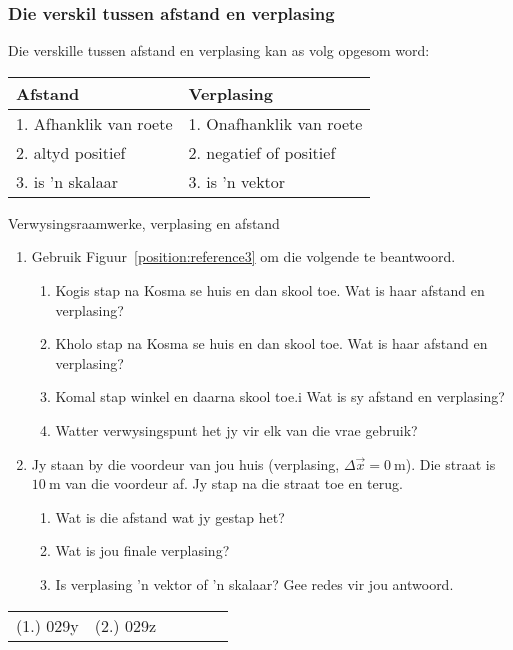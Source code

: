 \subsubsection*{Die verskil tussen afstand en verplasing}
            \nopagebreak
Die verskille tussen afstand en verplasing kan as volg opgesom word:\par
\begin{center}
\begin{tabular}{|l|l|}\hline
\textbf{ Afstand} & \textbf{ Verplasing} \\\hline
1. Afhanklik van roete & 1. Onafhanklik van roete \\\hline
2. altyd positief & 2. negatief of positief \\\hline
3. is 'n skalaar & 3. is 'n vektor\\\hline
\end{tabular}
\end{center}
    \par
\label{m38788*secfhsst!!!underscore!!!id498}
\begin{exercises}{Verwysingsraamwerke, verplasing en afstand}
\nopagebreak \noindent
\begin{enumerate}[noitemsep, label=\textbf{\arabic*}. ] 
\item Gebruik Figuur~\ref{position:reference3} om die volgende te beantwoord.
\begin{enumerate}[noitemsep, label=\textbf{\alph*}. ] 
    \item Kogis stap na Kosma se huis en dan skool toe. Wat is haar afstand en verplasing?
    \item Kholo stap na Kosma se huis en dan skool toe. Wat is haar afstand en verplasing?
    \item Komal stap winkel en daarna skool toe.i Wat is sy afstand en verplasing?
    \item Watter verwysingspunt het jy vir elk van die vrae gebruik?
\end{enumerate}
                
\item Jy staan by die voordeur van jou huis (verplasing, $\Delta \vec{x}=0~\text{m}$). Die straat is $10~\text{m}$ van die voordeur af. Jy stap na die straat toe en terug.
\begin{enumerate}[noitemsep, label=\textbf{\alph*}. ] 
    \item Wat is die afstand wat jy gestap het?
    \item Wat is jou finale verplasing?
    \item Is verplasing 'n vektor of 'n skalaar? Gee redes vir jou antwoord.
\end{enumerate}
\end{enumerate}
  \label{m38788**end}
\practiceinfo
 \par \begin{tabular}[h]{cccccc}
 (1.) 029y  &  (2.) 029z  & \end{tabular}
\end{exercises}



